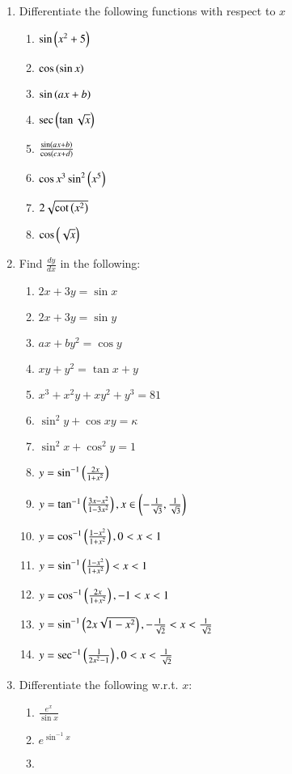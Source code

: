 \begin{enumerate}[label=\arabic*.,ref=\thesubsection.\theenumi]
%
\item Differentiate the following functions with respect to $x$
%
\begin{enumerate}
\item 
$
\sin \left(x^2+5\right)
$
\item 
$
\cos \left(\sin x\right)
$
\item 
$
 \sin\left(ax+b\right)
$
\item 
$
\sec \left(\tan \sqrt{x}\right)
$
\item 
$
\frac{\sin \left(ax+b\right)}{\cos \left( cx+d\right)}
$
\item 
$
\cos x^3 \sin^2\left(x^5\right)
$
\item 
$
2\sqrt{\cot \left(x^2\right)}
$
\item 
$
\cos\left(\sqrt{x}\right)
$
\end{enumerate}
\item Find $\frac{dy}{dx}$ in the following:
\begin{enumerate}
\item 
$
2x+3y = \sin x
$
\item 
$
2x+3y = \sin y
$
\item 
$
ax + by^2 = \cos y
$
\item 
$
xy+y^2 = \tan x + y
$
\item 
$
x^3+x^2y+xy^2+y^3 = 81
$
\item 
$
\sin^2 y + \cos xy = \kappa
$
\item 
$
\sin ^2 x + \cos ^2 y = 1
$
\item 
$
y = \sin^{-1}\left(\frac{2x}{1+x^2}\right)
$
\item 
$
y = \tan^{-1}\left(\frac{3x-x^2}{1-3x^2}\right), x \in \left(-\frac{1}{\sqrt{3}}, \frac{1}{\sqrt{3}}\right)
$
\item 
$
y = \cos^{-1}\left(\frac{1-x^2}{1+x^2}\right), 0 < x < 1
$
\item 
$
y = \sin^{-1}\left(\frac{1-x^2}{1+x^2}\right)  < x < 1
$
\item 
$
y = \cos^{-1}\left(\frac{2x}{1+x^2}\right), - 1 < x < 1
$
\item 
$
y = \sin^{-1}\left(2x\sqrt{1-x^2}\right), -\frac{1}{\sqrt{2}} < x < \frac{1}{\sqrt{2}}
$
\item 
$
y = \sec^{-1}\left(\frac{1}{2x^2-1}\right), 0 < x < \frac{1}{\sqrt{2}}
$
\end{enumerate}
\item Differentiate the following w.r.t. $x$:
\begin{enumerate}
\item 
$
\frac{e^x}{\sin x}
$
\item 
$
e^{\sin ^{-1} x}
$
\item 

\end{enumerate}
\end{enumerate}
